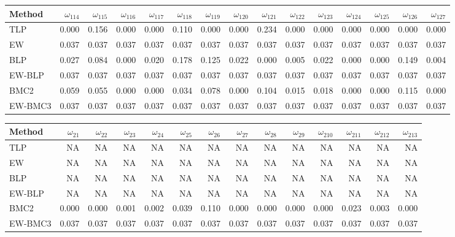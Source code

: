 \documentclass[
]{article}
\begin{document}
\begin{tabular}{lrrrrrrrrrrrrrr}
\toprule
Method & $\omega_{114}$ & $\omega_{115}$ & $\omega_{116}$ & $\omega_{117}$ & $\omega_{118}$ & $\omega_{119}$ & $\omega_{120}$ & $\omega_{121}$ & $\omega_{122}$ & $\omega_{123}$ & $\omega_{124}$ & $\omega_{125}$ & $\omega_{126}$ & $\omega_{127}$\\
\midrule
TLP & 0.000 & 0.156 & 0.000 & 0.000 & 0.110 & 0.000 & 0.000 & 0.234 & 0.000 & 0.000 & 0.000 & 0.000 & 0.000 & 0.000\\
EW & 0.037 & 0.037 & 0.037 & 0.037 & 0.037 & 0.037 & 0.037 & 0.037 & 0.037 & 0.037 & 0.037 & 0.037 & 0.037 & 0.037\\
BLP & 0.027 & 0.084 & 0.000 & 0.020 & 0.178 & 0.125 & 0.022 & 0.000 & 0.005 & 0.022 & 0.000 & 0.000 & 0.149 & 0.004\\
EW-BLP & 0.037 & 0.037 & 0.037 & 0.037 & 0.037 & 0.037 & 0.037 & 0.037 & 0.037 & 0.037 & 0.037 & 0.037 & 0.037 & 0.037\\
BMC2 & 0.059 & 0.055 & 0.000 & 0.000 & 0.034 & 0.078 & 0.000 & 0.104 & 0.015 & 0.018 & 0.000 & 0.000 & 0.115 & 0.000\\
EW-BMC3 & 0.037 & 0.037 & 0.037 & 0.037 & 0.037 & 0.037 & 0.037 & 0.037 & 0.037 & 0.037 & 0.037 & 0.037 & 0.037 & 0.037\\
\bottomrule
\end{tabular}

\begin{tabular}{lrrrrrrrrrrrrr}
\toprule
Method & $\omega_{21}$ & $\omega_{22}$ & $\omega_{23}$ & $\omega_{24}$ & $\omega_{25}$ & $\omega_{26}$ & $\omega_{27}$ & $\omega_{28}$ & $\omega_{29}$ & $\omega_{210}$ & $\omega_{211}$ & $\omega_{212}$ & $\omega_{213}$\\
\midrule
TLP & NA & NA & NA & NA & NA & NA & NA & NA & NA & NA & NA & NA & NA\\
EW & NA & NA & NA & NA & NA & NA & NA & NA & NA & NA & NA & NA & NA\\
BLP & NA & NA & NA & NA & NA & NA & NA & NA & NA & NA & NA & NA & NA\\
EW-BLP & NA & NA & NA & NA & NA & NA & NA & NA & NA & NA & NA & NA & NA\\
BMC2 & 0.000 & 0.000 & 0.001 & 0.002 & 0.039 & 0.110 & 0.000 & 0.000 & 0.000 & 0.000 & 0.023 & 0.003 & 0.000\\
EW-BMC3 & 0.037 & 0.037 & 0.037 & 0.037 & 0.037 & 0.037 & 0.037 & 0.037 & 0.037 & 0.037 & 0.037 & 0.037 & 0.037\\
\bottomrule
\end{tabular}
\end{document}
